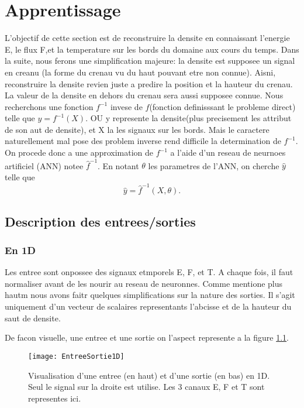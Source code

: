 
\chapter{Apprentissage} %

\label{Chapter4} %

L'objectif de cette section est de reconstruire la densite en connaissant l'energie E, le flux F,et la temperature sur les bords du domaine aux cours du temps. Dans la suite, nous ferons une simplification majeure: la densite est supposee un signal en creanu (la forme du crenau vu du haut pouvant etre non connue). Aisni, reconstruire la densite revien juste a predire la position et la hauteur du crenau. La valeur de la densite en dehors du crenau sera aussi supposee connue. Nous recherchons une fonction $f^{-1}$ invese de $f$(fonction definisssant le probleme direct) telle que $y = f^{-1}(X)$. OU y represente la densite(plus precisement les attribut de son aut de densite), et X la les signaux sur les bords. Mais le caractere naturellement mal pose des problem inverse rend difficile la determination de $f^{-1}$. On procede donc a une approximation de $f^{-1}$ a l'aide d'un reseau de neurnoes artificiel (ANN) notee $\hat{f}^{-1}$. En notant $\theta$ les parametres de l'ANN, on cherche $\hat{y}$ telle que$$ \hat{y} = \hat{f}^{-1}(X, \theta). $$


\section{Description des entrees/sorties}

\subsection{En 1D}
Les entree sont onpossee des signaux etmporels E, F, et T. A chaque fois, il faut normaliser avant de les nourir au reseau de neuronnes. Comme mentione plus hautm nous avons faitr quelques simplifications sur la nature des sorties. Il s'agit uniquement d'un vecteur de scalaires representants l'abcisse et de la hauteur du saut de densite.

De facon visuelle, une entree et une sortie on l'aspect represente a la figure \ref{fig:EntreeSortie1D}.

\begin{figure}[!h]
\centering
\texttt{[image: EntreeSortie1D]} 
\decoRule
\caption[EntreeSortie1D]{Visualisation d'une entree (en haut) et d'une sortie (en bas) en 1D. Seul le signal sur la droite est utilise. Les 3 canaux E, F et T sont representes ici.}
\label{fig:EntreeSortie1D}
\end{figure}

